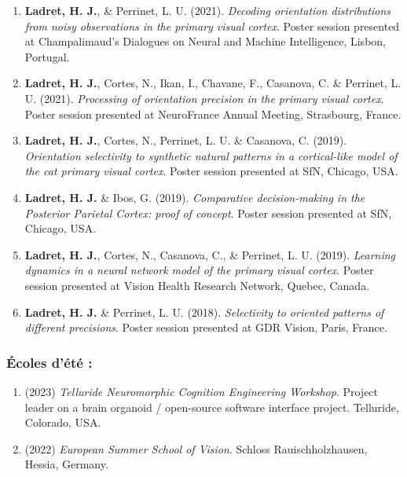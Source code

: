 \begin{enumerate}
\item \textbf{Ladret, H. J.}, \& Perrinet, L. U. (2021). \textit{Decoding orientation distributions from noisy observations in the primary visual cortex}. Poster session presented at Champalimaud's Dialogues on Neural and Machine Intelligence, Lisbon, Portugal.
\item \textbf{Ladret, H. J.}, Cortes, N., Ikan, I., Chavane, F., Casanova, C. \& Perrinet, L. U. (2021). \textit{Processing of orientation precision in the primary visual cortex}. Poster session presented at NeuroFrance Annual Meeting, Strasbourg, France.
\item \textbf{Ladret, H. J.}, Cortes, N., Perrinet, L. U. \& Casanova, C. (2019). \textit{Orientation selectivity to synthetic natural patterns in a cortical-like model of the cat primary visual cortex}. Poster session presented at SfN, Chicago, USA.
\item \textbf{Ladret, H. J.} \& Ibos, G. (2019). \textit{Comparative decision-making in the Posterior Parietal Cortex: proof of concept}. Poster session presented at SfN, Chicago, USA.
\item \textbf{Ladret, H. J.}, Cortes, N., Casanova, C., \& Perrinet, L. U. (2019). \textit{Learning dynamics in a neural network model of the primary visual cortex}. Poster session presented at Vision Health Research Network, Quebec, Canada. 
\item \textbf{Ladret, H. J.} \& Perrinet, L. U. (2018). \textit{Selectivity to oriented patterns of different precisions}. Poster session presented at GDR Vision, Paris, France. 
\end{enumerate}

\subsubsection*{Écoles d'été :}
\begin{enumerate}
\item (2023) \textit{Telluride Neuromorphic Cognition Engineering Workshop}. Project leader on a brain organoid / open-source software interface project. Telluride, Colorado, USA.
\item (2022) \textit{European Summer School of Vision}. Schloss Rauischholzhausen, Hessia, Germany.
\end{enumerate}